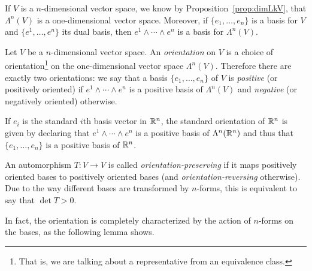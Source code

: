 If $V$ is a $n$-dimensional vector space, we know by Proposition~\ref{prop:dimLkV}, that $\Lambda^n(V)$ is a one-dimensional vector space.
Moreover, if $\{e_1,\ldots,e_n\}$ is a basis for $V$ and $\{e^1,\ldots,e^n\}$ its dual basis, then $e^1\wedge\cdots\wedge e^n$ is a basis for $\Lambda^n(V)$.

\begin{definition}
	Let $V$ be a $n$-dimensional vector space.
	An \emph{orientation} on $V$ is a choice of orientation\footnote{That is, we are talking about a representative from an equivalence class.} on the one-dimensional vector space $\Lambda^n(V)$.
	Therefore there are exactly two orientations: we say that a basis $\{e_1,\ldots,e_n\}$ of $V$ is \emph{positive} (or positively oriented) if $e^1\wedge\cdots\wedge e^n$ is a positive basis of $\Lambda^n(V)$ and \emph{negative} (or negatively oriented) otherwise.
\end{definition}

\begin{example}
	If $e_i$ is the standard $i$th basis vector in $\mathbb{R}^n$, the standard orientation of $\mathbb{R}^n$ is given by declaring that $e^1\wedge\cdots\wedge e^n$ is a positive basis of $\Lambda^n(\mathbb{R}^n)$ and thus that $\{e_1,\ldots,e_n\}$ is a positive basis of $\mathbb{R}^n$.
\end{example}

An automorphism $T:V\to V$ is called \emph{orientation-preserving} if it maps positively oriented bases to positively oriented bases (and \emph{orientation-reversing} otherwise).
Due to the way different bases are transformed by $n$-forms, this is equivalent to say that $\det T > 0$.


In fact, the orientation is completely characterized by the action of $n$-forms on the bases, as the following lemma shows.


